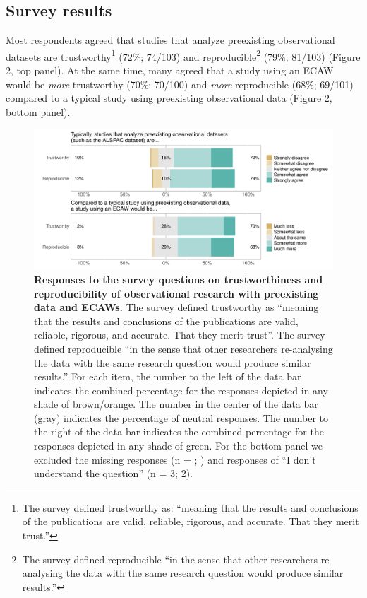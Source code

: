\documentclass[
  man,floatsintext]{apa6}
\begin{document}
\hypertarget{survey-results}{%
\subsection{Survey results}\label{survey-results}}

Most respondents agreed that studies that analyze preexisting observational datasets are trustworthy\footnote{The survey defined trustworthy as: ``meaning that the results and conclusions of the publications are valid, reliable, rigorous, and accurate. That they merit trust.''} (72\%; 74/103) and reproducible\footnote{The survey defined reproducible ``in the sense that other researchers re-analysing the data with the same research question would produce similar results.''} (79\%; 81/103) (Figure 2, top panel). At the same time, many agreed that a study using an ECAW would be \emph{more} trustworthy (70\%; 70/100) and \emph{more} reproducible (68\%; 69/101) compared to a typical study using preexisting observational data (Figure 2, bottom panel).

\begin{figure}

{\centering \includegraphics[width=1\linewidth]{figs/typicallyEcawPlot-1} 

}

\caption{\textbf{Responses to the survey questions on trustworthiness and reproducibility of observational research with preexisting data and ECAWs.} The survey defined trustworthy as ``meaning that the results and conclusions of the publications are valid, reliable, rigorous, and accurate. That they merit trust''. The survey defined reproducible ``in the sense that other researchers re-analysing the data with the same research question would produce similar results.'' For each item, the number to the left of the data bar indicates the combined percentage for the responses depicted in any shade of brown/orange. The number in the center of the data bar (gray) indicates the percentage of neutral responses. The number to the right of the data bar indicates the combined percentage for the responses depicted in any shade of green. For the bottom panel we excluded the missing responses (n = ; ) and responses of ``I don't understand the question'' (n = 3; 2).}\label{fig:typicallyEcawPlot}
\end{figure}
\end{document}
